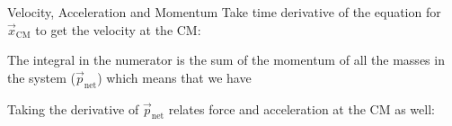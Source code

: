 \documentclass[12pt,compress,aspectratio=169]{beamer}
\begin{document}
\begin{frame}{Velocity, Acceleration and Momentum}
  Take time derivative of the equation for $\vec x_\text{CM}$ to get the
  velocity at the CM:
    
  
  The integral in the numerator is the sum of the momentum of all the masses in
  the system ($\vec p_\text{net}$) which means that we have


  Taking the derivative of $\vec p_\text{net}$ relates force and acceleration
  at the CM as well:
    
\end{frame}


\end{document}
